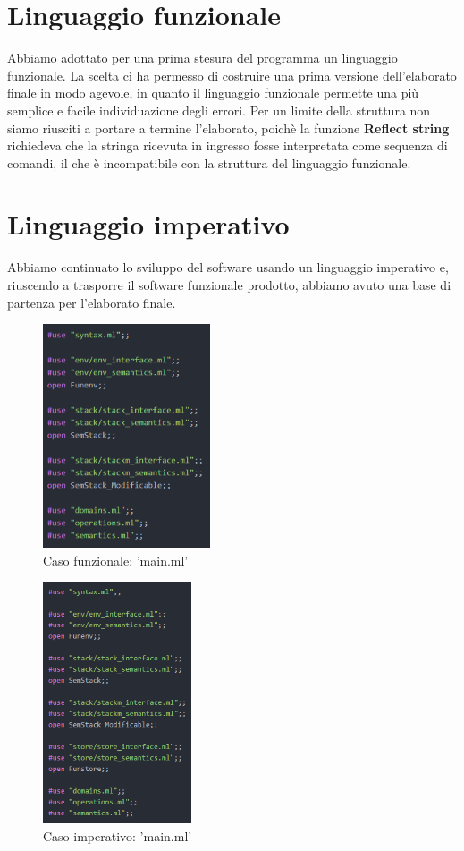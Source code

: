 \documentclass[a4paper,titlepage]{book}
\begin{document}
\section{Linguaggio funzionale}
Abbiamo adottato per una prima stesura del programma un linguaggio funzionale.
La scelta ci ha permesso di costruire una prima versione dell'elaborato finale in modo agevole, in quanto il linguaggio
funzionale permette una pi\`u semplice e facile individuazione degli errori.
Per un limite della struttura non siamo riusciti a portare a termine l'elaborato, poich\`e la funzione \textbf{Reflect string} richiedeva che la stringa ricevuta in ingresso fosse interpretata come sequenza di comandi, il che \`e incompatibile con la struttura del
linguaggio funzionale.

\section{Linguaggio imperativo}
Abbiamo continuato lo sviluppo del software usando un linguaggio imperativo e, riuscendo a trasporre il software funzionale 
prodotto, abbiamo avuto una base di partenza per l'elaborato finale.

\begin{figure}[H]
\center
\includegraphics[height=250px]{img/main_funzionale.png}
\caption{Caso funzionale: 'main.ml' \label{fig:main_funzionale}}
\end{figure}

\begin{figure}[H]
\center
\includegraphics[height=270px]{img/main_imperativo.png}
\caption{Caso imperativo: 'main.ml' \label{fig:main_imperativo}}
\end{figure}
\end{document}
